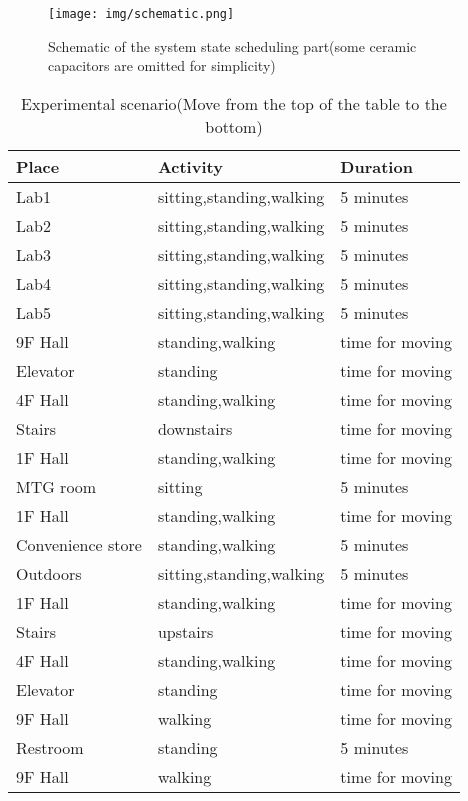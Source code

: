 \documentclass[conference]{IEEEtran}
\begin{document}
\begin{figure}[t]
    \centering
    \texttt{[image: img/schematic.png]}
    \caption{Schematic of the system state scheduling part(some ceramic capacitors are omitted for simplicity)}
    \label{fig:schematic}
\end{figure}

\begin{table}[b]
    \centering
    \caption{Experimental scenario(Move from the top of the table to the bottom)}
    \label{tab:scenario}
    \begin{tabular}{lll} \hline
        Place & Activity & Duration \\ \hline \hline
        Lab1 & sitting,standing,walking & 5 minutes \\
        Lab2 & sitting,standing,walking & 5 minutes \\
        Lab3 & sitting,standing,walking & 5 minutes \\
        Lab4 & sitting,standing,walking & 5 minutes \\
        Lab5 & sitting,standing,walking & 5 minutes \\
        9F Hall & standing,walking & time for moving \\
        Elevator & standing & time for moving \\
        4F Hall & standing,walking & time for moving \\
        Stairs  & downstairs & time for moving \\
        1F Hall & standing,walking & time for moving \\
        MTG room & sitting & 5 minutes \\
        1F Hall  & standing,walking & time for moving \\
        Convenience store & standing,walking & 5 minutes \\
        Outdoors & sitting,standing,walking& 5 minutes \\
        1F Hall & standing,walking & time for moving \\
        Stairs & upstairs & time for moving \\
        4F Hall & standing,walking & time for moving \\
        Elevator & standing & time for moving \\
        9F Hall & walking & time for moving \\
        Restroom & standing & 5 minutes \\
        9F Hall & walking & time for moving \\ \hline
    \end{tabular}
\end{table}
\end{document}
